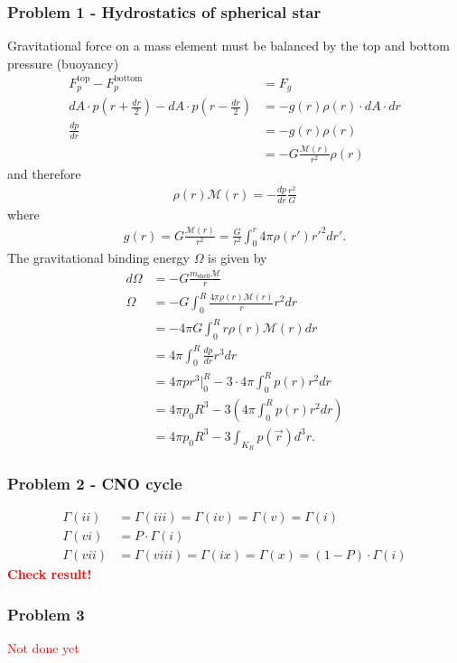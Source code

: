 \documentclass[10pt,a4paper]{book}
\theoremstyle{definition}
\begin{document}
\subsubsection{Problem 1 - Hydrostatics of spherical star}
Gravitational force on a mass element must be balanced by the top and bottom pressure (buoyancy)
\begin{align}
    F_p^\text{top}-F_p^\text{bottom}&=F_g\\
    dA\cdot p\left(r+\frac{dr}{2}\right)-dA\cdot p\left(r-\frac{dr}{2}\right)&=-g(r)\rho(r)\cdot dA\cdot dr\\
    \frac{dp}{dr} &=-g(r)\rho(r)\\
    &=-G\frac{\mathcal{M}(r)}{r^2}\rho(r)
\end{align}
and therefore
\begin{align}
   \rho(r)\mathcal{M}(r)=-\frac{dp}{dr}\frac{r^2}{G}
\end{align}
where
\begin{align}
    g(r)=G\frac{\mathcal{M}(r)}{r^2}=\frac{G}{r^2}\int_0^r4\pi\rho(r')r'^2dr'.
\end{align}
The gravitational binding energy $\Omega$ is given by
\begin{align}
    d\Omega&=-G\frac{m_\text{shell}\mathcal{M}}{r}\\
    \Omega&=-G\int_0^R\frac{4\pi\rho(r)\mathcal{M}(r)}{r}r^2dr\\
    &=-4\pi G\int_0^Rr\rho(r)\mathcal{M}(r)dr\\
    &=4\pi\int_0^R\frac{dp}{dr}r^3dr\\
    &=4\pi p r^3|_0^R - 3\cdot4\pi\int_0^Rp(r)r^2dr\\
    &=4\pi p_0 R^3 - 3\left(4\pi\int_0^Rp(r)r^2dr\right)\\
    &=4\pi p_0 R^3 - 3\int_{K_R}p(\vec{r})d^3r.
\end{align}
\subsubsection{Problem 2 - CNO cycle}
\begin{align}
    \Gamma(ii)&=\Gamma(iii)=\Gamma(iv)=\Gamma(v)=\Gamma(i)\\
    \Gamma(vi)&=P\cdot\Gamma(i)\\
    \Gamma(vii)&=\Gamma(viii)=\Gamma(ix)=\Gamma(x)=(1-P)\cdot\Gamma(i)
\end{align}
\textcolor{red}{\bf Check result!}

\subsubsection{Problem 3}
\textcolor{red}{Not done yet}
\end{document}

